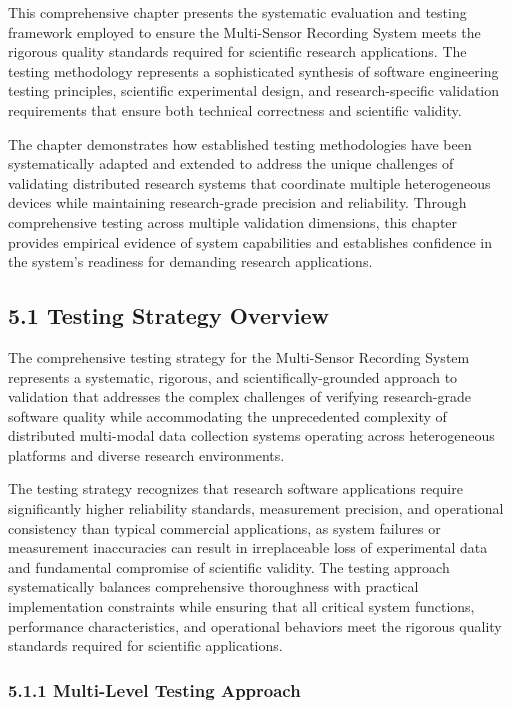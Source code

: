 \documentclass[12pt,a4paper]{article}
\begin{document}
This comprehensive chapter presents the systematic evaluation and testing framework employed to ensure the Multi-Sensor
Recording System meets the rigorous quality standards required for scientific research applications. The testing
methodology represents a sophisticated synthesis of software engineering testing principles, scientific experimental
design, and research-specific validation requirements that ensure both technical correctness and scientific validity.

The chapter demonstrates how established testing methodologies have been systematically adapted and extended to address
the unique challenges of validating distributed research systems that coordinate multiple heterogeneous devices while
maintaining research-grade precision and reliability. Through comprehensive testing across multiple validation
dimensions, this chapter provides empirical evidence of system capabilities and establishes confidence in the system's
readiness for demanding research applications.

\subsection{5.1 Testing Strategy Overview}

The comprehensive testing strategy for the Multi-Sensor Recording System represents a systematic, rigorous, and
scientifically-grounded approach to validation that addresses the complex challenges of verifying research-grade
software quality while accommodating the unprecedented complexity of distributed multi-modal data collection systems
operating across heterogeneous platforms and diverse research environments.

The testing strategy recognizes that research software applications require significantly higher reliability standards,
measurement precision, and operational consistency than typical commercial applications, as system failures or
measurement inaccuracies can result in irreplaceable loss of experimental data and fundamental compromise of scientific
validity. The testing approach systematically balances comprehensive thoroughness with practical implementation
constraints while ensuring that all critical system functions, performance characteristics, and operational behaviors
meet the rigorous quality standards required for scientific applications.

\subsubsection{5.1.1 Multi-Level Testing Approach}
\end{document}
